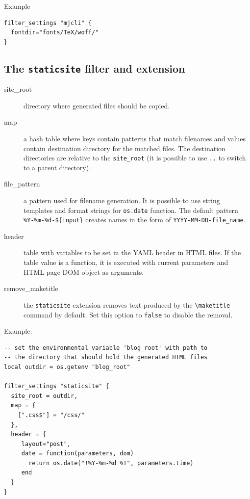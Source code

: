 Example

\begin{verbatim}
filter_settings "mjcli" {
  fontdir="fonts/TeX/woff/" 
}
\end{verbatim}

\subsection{\texorpdfstring{The \texttt{staticsite} filter and
extension}{The staticsite filter and extension}}\label{the-staticsite-filter-and-extension}

\begin{description}
\item[site\_root]
directory where generated files should be copied.
\item[map]
a hash table where keys contain patterns that match filenames and values
contain destination directory for the matched files. The destination
directories are relative to the \texttt{site\_root} (it is possible to
use \texttt{..} to switch to a parent directory).
\item[file\_pattern]
a pattern used for filename generation. It is possible to use string
templates and format strings for \texttt{os.date} function. The default
pattern \texttt{\%Y-\%m-\%d-\$\{input\}} creates names in the form of
\texttt{YYYY-MM-DD-file\_name}.
\item[header]
table with variables to be set in the YAML header in HTML files. If the
table value is a function, it is executed with current parameters and
HTML page DOM object as arguments.
\item[remove\_maketitle]
the \texttt{staticsite} extension removes text produced by the
\texttt{\textbackslash{}maketitle} command by default. Set this option
to \texttt{false} to disable the removal.
\end{description}

Example:

\begin{verbatim}
-- set the environmental variable 'blog_root' with path to 
-- the directory that should hold the generated HTML files
local outdir = os.getenv "blog_root" 

filter_settings "staticsite" {
  site_root = outdir, 
  map = {
    [".css$"] = "/css/"
  },
  header = {
     layout="post",
     date = function(parameters, dom)
       return os.date("!%Y-%m-%d %T", parameters.time)
     end
  }
}
\end{verbatim}

